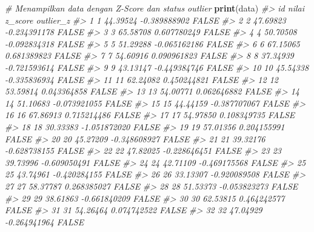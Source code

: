\documentclass[
  oneside]{book}
\newenvironment{Shaded}{\begin{snugshade}}{\end{snugshade}}
\newcommand{\CommentTok}[1]{\textcolor[rgb]{0.56,0.35,0.01}{\textit{#1}}}
\newcommand{\FunctionTok}[1]{\textcolor[rgb]{0.13,0.29,0.53}{\textbf{#1}}}
\newcommand{\NormalTok}[1]{#1}
\begin{document}
\begin{Shaded}
\begin{Highlighting}[]
\CommentTok{\# Menampilkan data dengan Z{-}Score dan status outlier}
\FunctionTok{print}\NormalTok{(data)}
\CommentTok{\#\textgreater{}      id     nilai      z\_score outlier\_z}
\CommentTok{\#\textgreater{} 1     1  44.39524 {-}0.389888902     FALSE}
\CommentTok{\#\textgreater{} 2     2  47.69823 {-}0.234391178     FALSE}
\CommentTok{\#\textgreater{} 3     3  65.58708  0.607780249     FALSE}
\CommentTok{\#\textgreater{} 4     4  50.70508 {-}0.092834318     FALSE}
\CommentTok{\#\textgreater{} 5     5  51.29288 {-}0.065162186     FALSE}
\CommentTok{\#\textgreater{} 6     6  67.15065  0.681389823     FALSE}
\CommentTok{\#\textgreater{} 7     7  54.60916  0.090961823     FALSE}
\CommentTok{\#\textgreater{} 8     8  37.34939 {-}0.721593614     FALSE}
\CommentTok{\#\textgreater{} 9     9  43.13147 {-}0.449384746     FALSE}
\CommentTok{\#\textgreater{} 10   10  45.54338 {-}0.335836934     FALSE}
\CommentTok{\#\textgreater{} 11   11  62.24082  0.450244821     FALSE}
\CommentTok{\#\textgreater{} 12   12  53.59814  0.043364858     FALSE}
\CommentTok{\#\textgreater{} 13   13  54.00771  0.062646882     FALSE}
\CommentTok{\#\textgreater{} 14   14  51.10683 {-}0.073921055     FALSE}
\CommentTok{\#\textgreater{} 15   15  44.44159 {-}0.387707067     FALSE}
\CommentTok{\#\textgreater{} 16   16  67.86913  0.715214486     FALSE}
\CommentTok{\#\textgreater{} 17   17  54.97850  0.108349735     FALSE}
\CommentTok{\#\textgreater{} 18   18  30.33383 {-}1.051872020     FALSE}
\CommentTok{\#\textgreater{} 19   19  57.01356  0.204155991     FALSE}
\CommentTok{\#\textgreater{} 20   20  45.27209 {-}0.348608927     FALSE}
\CommentTok{\#\textgreater{} 21   21  39.32176 {-}0.628738155     FALSE}
\CommentTok{\#\textgreater{} 22   22  47.82025 {-}0.228646451     FALSE}
\CommentTok{\#\textgreater{} 23   23  39.73996 {-}0.609050491     FALSE}
\CommentTok{\#\textgreater{} 24   24  42.71109 {-}0.469175568     FALSE}
\CommentTok{\#\textgreater{} 25   25  43.74961 {-}0.420284155     FALSE}
\CommentTok{\#\textgreater{} 26   26  33.13307 {-}0.920089508     FALSE}
\CommentTok{\#\textgreater{} 27   27  58.37787  0.268385027     FALSE}
\CommentTok{\#\textgreater{} 28   28  51.53373 {-}0.053823273     FALSE}
\CommentTok{\#\textgreater{} 29   29  38.61863 {-}0.661840209     FALSE}
\CommentTok{\#\textgreater{} 30   30  62.53815  0.464242577     FALSE}
\CommentTok{\#\textgreater{} 31   31  54.26464  0.074742522     FALSE}
\CommentTok{\#\textgreater{} 32   32  47.04929 {-}0.264941964     FALSE}

\end{Highlighting}
\end{Shaded}
\end{document}
